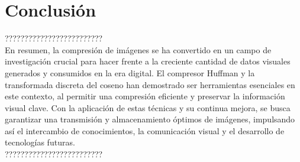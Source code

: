 \documentclass[12pt,a4paper]{article}
\begin{document}
\newpage
\section{Conclusión}

?????????????????????????\\
En resumen, la compresión de imágenes se ha convertido en un campo de investigación crucial para hacer frente a la creciente cantidad de datos visuales generados y consumidos en la era digital. El compresor Huffman y la transformada discreta del coseno han demostrado ser herramientas esenciales en este contexto, al permitir una compresión eficiente y preservar la información visual clave. Con la aplicación de estas técnicas y su continua mejora, se busca garantizar una transmisión y almacenamiento óptimos de imágenes, impulsando así el intercambio de conocimientos, la comunicación visual y el desarrollo de tecnologías futuras.\\
?????????????????????????


\newpage
\end{document}
